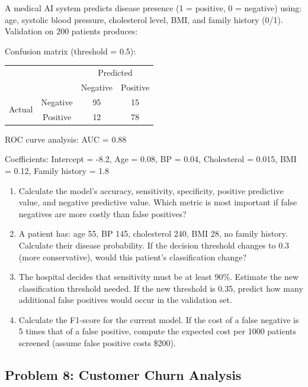 \documentclass[12pt]{article}
\begin{document}
A medical AI system predicts disease presence (1 = positive, 0 = negative) using: age, systolic blood pressure, cholesterol level, BMI, and family history (0/1). Validation on 200 patients produces:

Confusion matrix (threshold = 0.5):
\begin{center}
\begin{tabular}{cc|cc}
& & \multicolumn{2}{c}{Predicted} \\
& & Negative & Positive \\
\hline
\multirow{2}{*}{Actual} & Negative & 95 & 15 \\
& Positive & 12 & 78 \\
\end{tabular}
\end{center}

ROC curve analysis: AUC = 0.88

Coefficients: Intercept = -8.2, Age = 0.08, BP = 0.04, Cholesterol = 0.015, BMI = 0.12, Family history = 1.8

\begin{enumerate}[label=(\alph*)]
\item Calculate the model's accuracy, sensitivity, specificity, positive predictive value, and negative predictive value. Which metric is most important if false negatives are more costly than false positives?

\item A patient has: age 55, BP 145, cholesterol 240, BMI 28, no family history. Calculate their disease probability. If the decision threshold changes to 0.3 (more conservative), would this patient's classification change?

\item The hospital decides that sensitivity must be at least 90\%. Estimate the new classification threshold needed. If the new threshold is 0.35, predict how many additional false positives would occur in the validation set.

\item Calculate the F1-score for the current model. If the cost of a false negative is 5 times that of a false positive, compute the expected cost per 1000 patients screened (assume false positive costs \$200).
\end{enumerate}

\subsection*{Problem 8: Customer Churn Analysis}
\end{document}
